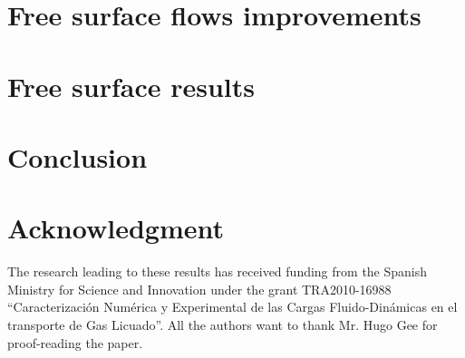 \documentclass[review]{elsarticle}
\begin{document}
\section{Free surface flows improvements}\label{Free_surface}




\section{Free surface results}\label{FS_results}










\section{Conclusion}



\section*{Acknowledgment}
The research  leading  to these results has received funding from the Spanish Ministry for Science and
 Innovation under the grant TRA2010-16988
``Caracterizaci\'on Num\'erica y Experimental de las Cargas Fluido-Din\'amicas en el transporte de Gas Licuado''.
All the authors want to thank Mr. Hugo Gee for proof-reading the paper.



\end{document}
